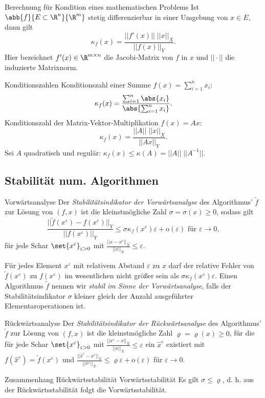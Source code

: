 \begin{karte}{Berechnung für Kondition eines mathematischen Problems}
    Ist \( \abb{f}{E\subset \R^n}{\R^m} \) stetig differenzierbar in einer Umgebung von \( x\in E \), 
    dann gilt 
    \[ \kappa_f(x) = \frac{||f'(x)|| \; ||x||_X }{ ||f(x)||_Y }. \] 
    Hier bezeichnet \( f'(x) \in \R^{m\times n} \) die Jacobi-Matrix von \(f\) in \(x\) und \( ||\cdot|| \) die 
    induzierte Matrixnorm.
\end{karte}

\begin{karte}{Konditionszahlen}
    Konditionszahl einer Summe \( f(x) = \sum_{i=1}^n x_i \):
    \[ \kappa_f(x) = \frac{ \sum_{i=1}^n \abs{x_i} }{ \abs{ \sum_{i=1}^n x_i } }. \]
    Konditionszahl der Matrix-Vektor-Multiplikation \( f(x) = Ax \):
    \[ \kappa_f(x) = \frac{||A||\;||x||_X}{||Ax||_Y}. \]
    Sei \(A\) quadratisch und regulär: \(\kappa_f(x) \leq \kappa(A) = ||A||\;||A^{-1}||\). 
\end{karte}

\subsection*{Stabilität num. Algorithmen}

\begin{karte}{Vorwärtsanalyse}
    Der \textit{Stabilitätsindikator der Vorwärtsanalyse} des Algorithmus' 
    \( \tilde{f} \) zur Lösung von \( (f,x) \) ist die kleinstmögliche Zahl \( \sigma = \sigma(x) \geq 0 \), 
    sodass gilt 
    \[ \frac{ ||\tilde{f}(x^\varepsilon) - f(x^\varepsilon)||_Y }{||f(x^\varepsilon)||_Y} 
    \leq \sigma \kappa_f(x^\varepsilon)\varepsilon + \mathrm{o}(\varepsilon) \text{ für }\varepsilon \rightarrow 0, \]
    für jede Schar \( \set{x^\varepsilon}_{\varepsilon > 0} \) mit \( \frac{ ||x - x^\varepsilon||_X }{ ||x||_X } \leq \varepsilon \).

    Für jedes Element \( x^\varepsilon \) mit relativem Abstand \(\varepsilon\) zu \(x\) darf der relative 
    Fehler von \( \tilde{f}(x^\varepsilon) \) zu \( f(x^\varepsilon) \) im wesentlichen nicht größer sein als 
    \( \sigma \kappa_f(x^\varepsilon)\varepsilon \).
    Einen Algorithmus \( \tilde{f} \) nennen wir \textit{stabil im Sinne der Vorwärtsanalyse}, falls der Stabilitätsindikator \( \sigma \) kleiner 
    gleich der Anzahl ausgeführter Elementaroperationen ist.
\end{karte}

\begin{karte}{Rückwärtsanalyse}
    Der \textit{Stabilitätsindikator der Rückwärtsanalyse} des Algorithmus' \(\tilde{f}\) 
    zur Lösung von \( (f,x) \) ist die kleinstmögliche Zahl \( \varrho = \varrho(x) \geq 0 \), 
    für die für jede Schar \( \set{x^\varepsilon}_{\varepsilon>0} \) mit 
    \( \frac{||x^\varepsilon - x||_X}{||x||_X} \leq \varepsilon \) ein 
    \( \widehat{x}^\varepsilon \) existiert mit \( f(\widehat{x}^\varepsilon) = \tilde{f}(x^\varepsilon) \) 
    und \( \frac{ ||\widehat{x}^\varepsilon - x^\varepsilon||_X }{||x^\varepsilon||_X} \leq \varrho\varepsilon + \mathrm{o}(\varepsilon) \) 
    für \( \varepsilon \rightarrow 0 \).
\end{karte}

\begin{karte}{Zusammenhang Rückwärtsstabilität Vorwärtsstabilität}
    Es gilt \( \sigma \leq \varrho \), d. h. aus der Rückwärtsstabilität folgt die Vorwärtsstabilität.
\end{karte}